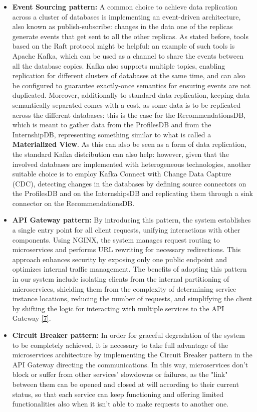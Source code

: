 \begin{itemize}
    \item \textbf{Event Sourcing pattern:} A common choice to achieve data replication across a cluster of databases is implementing an event-driven architecture, also known as publish-subscribe: changes in the data one of the replicas generate events that get sent to all the other replicas. As stated before, tools based on the Raft protocol might be helpful: an example of such tools is Apache Kafka, which can be used as a channel to share the events between all the database copies. Kafka also supports multiple topics, enabling replication for different clusters of databases at the same time, and can also be configured to guarantee exactly-once semantics for ensuring events are not duplicated. Moreover, additionally to standard data replication, keeping data semantically separated comes with a cost, as some data is to be replicated across the different databases: this is the case for the RecommendationsDB, which is meant to gather data from the ProfilesDB and from the InternshipDB, representing something similar to what is called a \textbf{Materialized View}. As this can also be seen as a form of data replication, the standard Kafka distribution can also help: however, given that the involved databases are implemented with heterogeneous technologies, another suitable choice is to employ Kafka Connect with Change Data Capture (CDC), detecting changes in the databases by defining source connectors on the ProfilesDB and on the InternshipsDB and replicating them through a sink connector on the RecommendationsDB.

    \item \textbf{API Gateway pattern:} By introducing this pattern, the system establishes a single entry point for all client requests, unifying interactions with other components. Using NGINX, the system manages request routing to microservices and performs URL rewriting for necessary redirections. This approach enhances security by exposing only one public endpoint and optimizes internal traffic management. The benefits of adopting this pattern in our system include isolating clients from the internal partitioning of microservices, shielding them from the complexity of determining service instance locations, reducing the number of requests, and simplifying the client by shifting the logic for interacting with multiple services to the API Gateway \hyperref[document: api_gateway]{[7]}.

    \item \textbf{Circuit Breaker pattern:} In order for graceful degradation of the system to be completely achieved, it is necessary to take full advantage of the microservices architecture by implementing the Circuit Breaker pattern in the API Gateway directing the communications. In this way, microservices don't block or suffer from other services' slowdowns or failures, as the "link" between them can be opened and closed at will according to their current status, so that each service can keep functioning and offering limited functionalities also when it isn't able to make requests to another one.
\end{itemize}